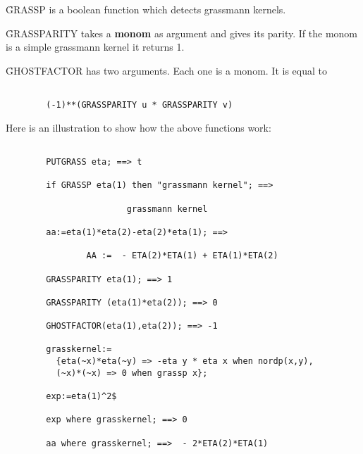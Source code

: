 \f{GRASSP} is a boolean function which detects grassmann kernels.

\f{GRASSPARITY} takes a {\bf monom}  as argument and gives its parity.
If the monom is a simple grassmann kernel it returns 1.

\f{GHOSTFACTOR} has two arguments. Each one is a monom. It is equal to
\begin{verbatim}

        (-1)**(GRASSPARITY u * GRASSPARITY v)

\end{verbatim}
Here is an illustration to show how the above functions work:
\begin{verbatim}

        PUTGRASS eta; ==> t

        if GRASSP eta(1) then "grassmann kernel"; ==>

                        grassmann kernel

        aa:=eta(1)*eta(2)-eta(2)*eta(1); ==>

                AA :=  - ETA(2)*ETA(1) + ETA(1)*ETA(2)

        GRASSPARITY eta(1); ==> 1

        GRASSPARITY (eta(1)*eta(2)); ==> 0

        GHOSTFACTOR(eta(1),eta(2)); ==> -1

        grasskernel:=
          {eta(~x)*eta(~y) => -eta y * eta x when nordp(x,y),
          (~x)*(~x) => 0 when grassp x};

        exp:=eta(1)^2$

        exp where grasskernel; ==> 0

        aa where grasskernel; ==>  - 2*ETA(2)*ETA(1)

\end{verbatim}
